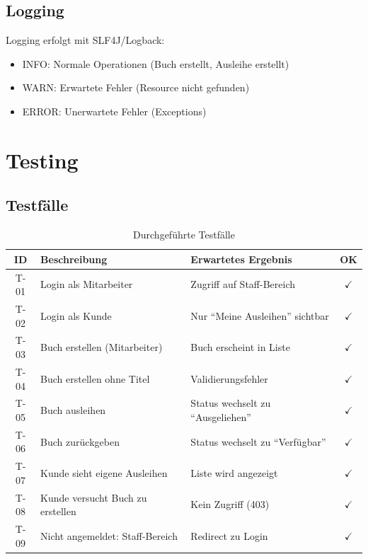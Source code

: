 \documentclass[a4paper,12pt,twoside]{report}
\newcommand{\cmark}{\textcolor{green!60!black}{$\checkmark$}}
\begin{document}
\subsection{Logging}
Logging erfolgt mit SLF4J/Logback:
\begin{itemize}
    \item INFO: Normale Operationen (Buch erstellt, Ausleihe erstellt)
    \item WARN: Erwartete Fehler (Resource nicht gefunden)
    \item ERROR: Unerwartete Fehler (Exceptions)
\end{itemize}

\newpage

\section{Testing}

\subsection{Testfälle}

\begin{table}[H]
\centering
\caption{Durchgeführte Testfälle}
\begin{tabularx}{\textwidth}{c X X c}
\toprule
\textbf{ID} & \textbf{Beschreibung} & \textbf{Erwartetes Ergebnis} & \textbf{OK} \\
\midrule
T-01 & Login als Mitarbeiter & Zugriff auf Staff-Bereich & \cmark \\
T-02 & Login als Kunde & Nur ``Meine Ausleihen'' sichtbar & \cmark \\
T-03 & Buch erstellen (Mitarbeiter) & Buch erscheint in Liste & \cmark \\
T-04 & Buch erstellen ohne Titel & Validierungsfehler & \cmark \\
T-05 & Buch ausleihen & Status wechselt zu ``Ausgeliehen'' & \cmark \\
T-06 & Buch zurückgeben & Status wechselt zu ``Verfügbar'' & \cmark \\
T-07 & Kunde sieht eigene Ausleihen & Liste wird angezeigt & \cmark \\
T-08 & Kunde versucht Buch zu erstellen & Kein Zugriff (403) & \cmark \\
T-09 & Nicht angemeldet: Staff-Bereich & Redirect zu Login & \cmark \\
\bottomrule
\end{tabularx}
\end{table}
\end{document}
